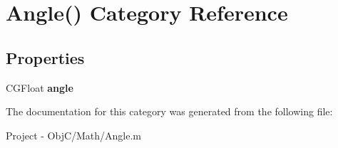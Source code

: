 \hypertarget{category_angle_07_08}{}\section{Angle() Category Reference}
\label{category_angle_07_08}
\subsection*{Properties}
\begin{DoxyCompactItemize}
\item 
\hypertarget{category_angle_07_08_a14a46e795e337ece6fd6df79e3f95078}{}C\+G\+Float {\bfseries angle}\label{category_angle_07_08_a14a46e795e337ece6fd6df79e3f95078}

\end{DoxyCompactItemize}


The documentation for this category was generated from the following file\+:\begin{DoxyCompactItemize}
\item 
Project -\/ Obj\+C/\+Math/Angle.\+m\end{DoxyCompactItemize}
